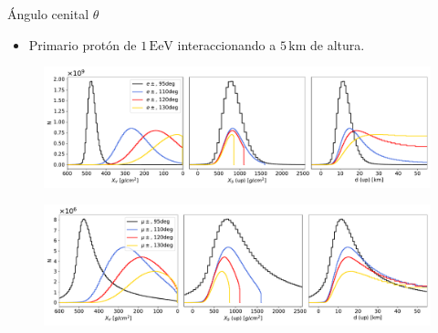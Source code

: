 \documentclass{beamer}
\begin{document}
\begin{frame}{Ángulo cenital $\theta$}
	\begin{itemize}
		\item Primario protón de $1\,\mathrm{EeV}$ interaccionando a $5\,\mathrm{km}$ de altura.
	\end{itemize}
		\begin{figure}[H]
		\centering
		\includegraphics[width=.95\linewidth]{figures/cascadas/upgoing_p_1EeV_vardeg_5km_e_v2}
	\end{figure}
	\begin{figure}[H]
	\centering
	\includegraphics[width=.95\linewidth]{figures/cascadas/upgoing_p_1EeV_vardeg_5km_mu_v2}
\end{figure}
\end{frame}
\end{document}
